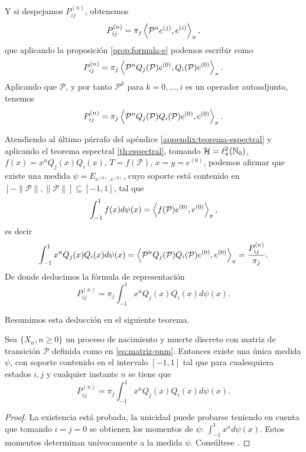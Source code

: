     Y si despejamos $P^{(n)}_{ij}$, obtenemos
    \begin{equation*}
        P^{(n)}_{ij} = \pi_j \left\langle \mathcal{P}^n e^{(j)} , e^{(i)} \right\rangle_\pi,
    \end{equation*}
    que aplicando la proposición \ref{prop:formula-e} podemos escribir como
    \begin{equation*}
        P^{(n)}_{ij} = \pi_j \left\langle \mathcal{P}^n Q_j(\mathcal{P})e^{(0)} , Q_{i}(\mathcal{P})e^{(0)} \right\rangle_\pi.
    \end{equation*}
    Aplicando que $\mathcal{P}$, y por tanto $\mathcal{P}^k$ para $k=0,\dots,i$ es un operador autoadjunto, tenemos
    \begin{equation*}
        P^{(n)}_{ij} = \pi_j \left\langle \mathcal{P}^n Q_j(\mathcal{P})Q_{i}(\mathcal{P})e^{(0)} , e^{(0)} \right\rangle_\pi.
    \end{equation*}

    Atendiendo al último párrafo del apéndice \ref{appendix:teorema-espectral} y aplicando el teorema espectral \ref{th:espectral}, tomando $\mathcal{H}=\ell_\pi^2(\mathbb{N}_0)$, $f(x)=x^n Q_j(x)Q_i(x)$, $T=f(\mathcal{P})$, $x=y=e^{(0)}$, podemos afirmar que existe una medida $\psi=E_{e^{(0)},e^{(0)}}$, cuyo soporte está contenido en $[-\|\mathcal{P}\|,\|\mathcal{P}\|]\subseteq[-1,1]$, tal que 
    \begin{equation*}
        \int_{-1}^1 f(x)d\psi(x) = \left\langle f(\mathcal{P})e^{(0)} , e^{(0)} \right\rangle_\pi,
    \end{equation*}
    es decir
    \begin{equation*}
        \int_{-1}^1 x^n Q_j(x)Q_i(x)d\psi(x) = \left\langle \mathcal{P}^n Q_j(\mathcal{P})Q_i(\mathcal{P})e^{(0)} , e^{(0)} \right\rangle_\pi = \dfrac{P_{ij}^{(n)}}{\pi_j}.
    \end{equation*}
    De donde deducimos la fórmula de representación
    \begin{equation*}
        P_{ij}^{(n)}=\pi_j \int_{-1}^1 x^n Q_j(x)Q_i(x)d\psi(x).
    \end{equation*}

    Resumimos esta deducción en el siguiente teorema.

    \begin{teorema}
        Sea $\{X_n, n\geq 0\}$ un proceso de nacimiento y muerte discreto con matriz de transición $\mathcal{P}$ definida como en \eqref{eq:matriz-pnm}. Entonces existe una única medida $\psi$, con soporte contenido en el intervalo $[-1,1]$ tal que para cualesquiera estados $i,j$ y cualquier instante $n$ se tiene que
        \begin{equation}
            \label{eq:formula-representacion}
            P_{ij}^{(n)}=\pi_j \int_{-1}^1 x^n Q_j(x)Q_i(x)d\psi(x).
        \end{equation}
    \end{teorema}
    \begin{proof}
        La existencia está probada, la unicidad puede probarse teniendo en cuenta que tomando $i=j=0$ se obtienen los momentos de $\psi$: $\int_{-1}^1 x^n d\psi(x)$. Estos momentos determinan unívocamente a la medida $\psi$. Consúltese \cite[Theorem 1]{random-walks}.
    \end{proof}

